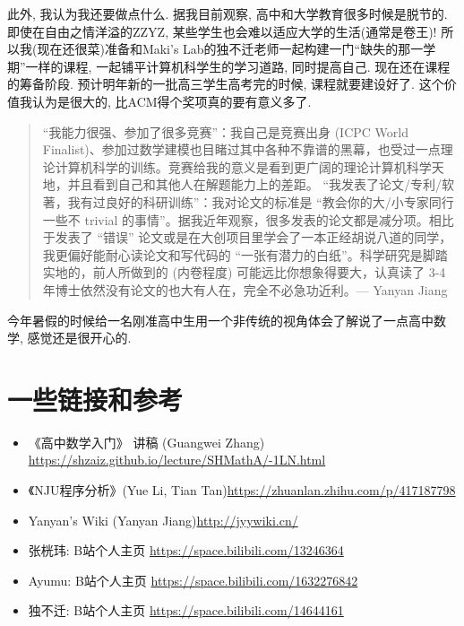     此外, 我认为我还要做点什么. 据我目前观察, 高中和大学教育很多时候是脱节的. 即使在自由之情洋溢的ZZYZ, 某些学生也会难以适应大学的生活(通常是卷王)! 所以我(现在还很菜)准备和Maki's Lab的独不迁老师一起构建一门``缺失的那一学期''一样的课程, 一起铺平计算机科学生的学习道路, 同时提高自己. 现在还在课程的筹备阶段. 预计明年新的一批高三学生高考完的时候, 课程就要建设好了. 这个价值我认为是很大的, 比ACM得个奖项真的要有意义多了. 

    \begin{quote}
        “我能力很强、参加了很多竞赛”：我自己是竞赛出身 (ICPC World Finalist)、参加过数学建模也目睹过其中各种不靠谱的黑幕，也受过一点理论计算机科学的训练。竞赛给我的意义是看到更广阔的理论计算机科学天地，并且看到自己和其他人在解题能力上的差距。 “我发表了论文/专利/软著，我有过良好的科研训练”：我对论文的标准是 “教会你的大/小专家同行一些不 trivial 的事情”。据我近年观察，很多发表的论文都是减分项。相比于发表了 “错误” 论文或是在大创项目里学会了一本正经胡说八道的同学，我更偏好能耐心读论文和写代码的 “一张有潜力的白纸”。科学研究是脚踏实地的，前人所做到的 (内卷程度) 可能远比你想象得要大，认真读了 3-4 年博士依然没有论文的也大有人在，完全不必急功近利。\hfill --- Yanyan Jiang
    \end{quote}

    今年暑假的时候给一名刚准高中生用一个非传统的视角体会了解说了一点高中数学, 感觉还是很开心的. 

    \section*{一些链接和参考}

    \begin{itemize}
        \item 《高中数学入门》 讲稿 (Guangwei Zhang) \url{https://shzaiz.github.io/lecture/SHMathA/-1LN.html}
        \item 《NJU程序分析》(Yue Li, Tian Tan)\url{https://zhuanlan.zhihu.com/p/417187798}
        \item Yanyan's Wiki (Yanyan Jiang)\url{http://jyywiki.cn/}
        \item 张桄玮: B站个人主页 \url{https://space.bilibili.com/13246364}
        \item Ayumu: B站个人主页 \url{https://space.bilibili.com/1632276842}
        \item 独不迁: B站个人主页 \url{https://space.bilibili.com/14644161}
    \end{itemize}
